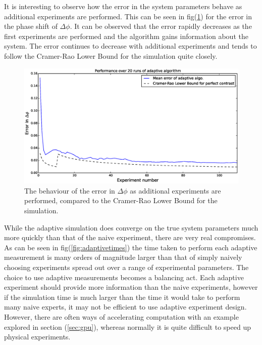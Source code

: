 It is interesting to observe how the error in the system parameters behave as additional experiments are performed. This can be seen in fig(\ref{fig:errexp}) for the error in the phase shift of $\Delta\phi$. It can be observed that the error rapidly decreases as the first experiments are performed and the algorithm gains information about the system. The error continues to decrease with additional experiments and tends to follow the Cramer-Rao Lower Bound for the simulation quite closely. 
 \begin{figure}[ht!]
\centering
\includegraphics[width=\textwidth]{Figures/meanerror.eps}
\caption{The behaviour of the error in $\Delta\phi$ as additional experiments are performed, compared to the Cramer-Rao Lower Bound for the simulation.}
\label{fig:errexp}
\end{figure}
While the adaptive simulation does converge on the true system parameters much more quickly than that of the naive experiment, there are very real compromises. As can be seen in fig(\ref{fig:adaptivetimes}) the time taken to perform each adaptive measurement is many orders of magnitude larger than that of simply naively choosing experiments spread out over a range of experimental parameters. The choice to use adaptive measurements becomes a balancing act. Each adaptive experiment should provide more information than the naive experiments, however if the simulation time is much larger than the time it would take to perform many naive experts, it may not be efficient to use adaptive experiment design. However, there are often ways of accelerating computation with an example explored in section (\ref{sec:gpu}), whereas normally it is quite difficult to speed up physical experiments.  
